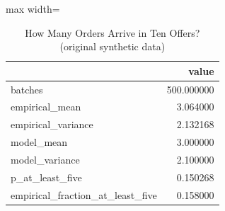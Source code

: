 \begin{table}[htbp]
\centering
\caption{How Many Orders Arrive in Ten Offers? (original synthetic data)}
\begingroup
\small
\setlength{\tabcolsep}{6pt}
\renewcommand{\arraystretch}{1.12}
\begin{adjustbox}{max width=\linewidth}
\begin{tabular}{@{}lr@{}}
\toprule
 & value \\
\midrule
batches & 500.000000 \\
empirical\_mean & 3.064000 \\
empirical\_variance & 2.132168 \\
model\_mean & 3.000000 \\
model\_variance & 2.100000 \\
p\_at\_least\_five & 0.150268 \\
empirical\_fraction\_at\_least\_five & 0.158000 \\
\bottomrule
\end{tabular}
\end{adjustbox}
\endgroup
\end{table}